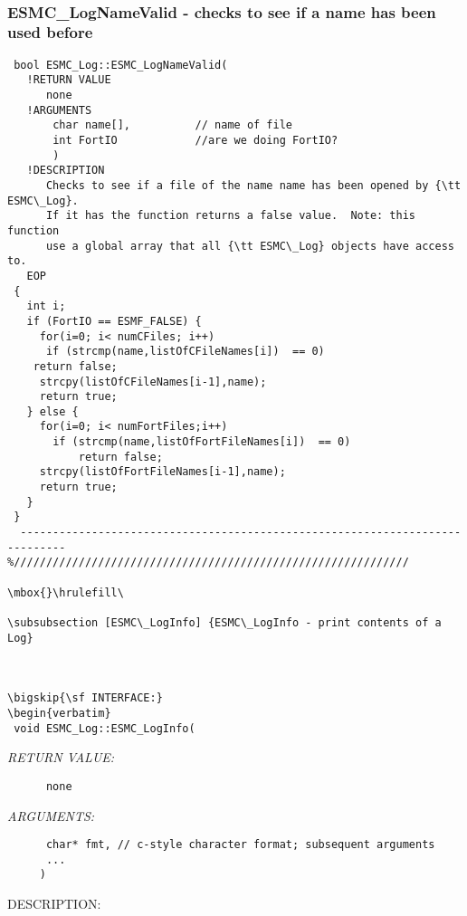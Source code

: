  
\mbox{}\hrulefill\ 
 
\subsubsection [ESMC\_LogNameValid] {ESMC\_LogNameValid - checks to see if a name has been used before}


  
\begin{verbatim} bool ESMC_Log::ESMC_LogNameValid(
   !RETURN VALUE
      none
   !ARGUMENTS
       char name[],          // name of file
       int FortIO            //are we doing FortIO?
       )
   !DESCRIPTION
      Checks to see if a file of the name name has been opened by {\tt ESMC\_Log}.
      If it has the function returns a false value.  Note: this function
      use a global array that all {\tt ESMC\_Log} objects have access to.
   EOP
 {
   int i;
   if (FortIO == ESMF_FALSE) {
     for(i=0; i< numCFiles; i++)
      if (strcmp(name,listOfCFileNames[i])  == 0) 
 	return false;
     strcpy(listOfCFileNames[i-1],name);
     return true;
   } else {
     for(i=0; i< numFortFiles;i++)
       if (strcmp(name,listOfFortFileNames[i])  == 0)
           return false;
     strcpy(listOfFortFileNames[i-1],name);
     return true;
   }
 }
  ----------------------------------------------------------------------------- 
%/////////////////////////////////////////////////////////////
 
\mbox{}\hrulefill\ 
 
\subsubsection [ESMC\_LogInfo] {ESMC\_LogInfo - print contents of a Log}


  
\bigskip{\sf INTERFACE:}
\begin{verbatim} 
 void ESMC_Log::ESMC_LogInfo(
 \end{verbatim}{\em RETURN VALUE:}
\begin{verbatim}      none\end{verbatim}{\em ARGUMENTS:}
\begin{verbatim} 
      char* fmt, // c-style character format; subsequent arguments
      ...
     )\end{verbatim}
{\sf DESCRIPTION:\\ }


